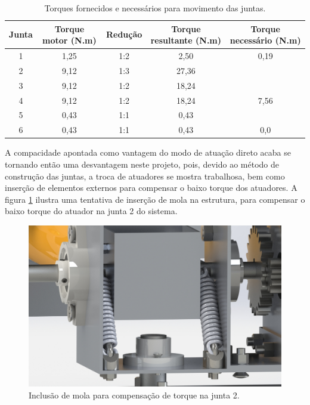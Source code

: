 \begin{table}[htb]
    \begin{centering}    
    
    \caption{Torques fornecidos e necessários para movimento das juntas.}
    
    \begin{tabular}{|c|c|c|c|c|}
        \hline
        Junta & Torque motor (N.m) & Redução & Torque resultante (N.m) & Torque necessário (N.m) \tabularnewline
        \hline
        \hline
        1 & 1,25 & 1:2 &  2,50 &  0,19              \tabularnewline
        \hline
        2 & 9,12 & 1:3 & 27,36 & \color{red}{34,32} \tabularnewline
        \hline
        3 & 9,12 & 1:2 & 18,24 & \color{red}{18,81} \tabularnewline
        \hline
        4 & 9,12 & 1:2 & 18,24 & 7,56               \tabularnewline
        \hline
        5 & 0,43 & 1:1 &  0,43 & \color{red}{4,01}  \tabularnewline
        \hline
        6 & 0,43 & 1:1 &  0,43 & 0,0                \tabularnewline
        \hline
    \end{tabular}
    
    \label{tab:Analise-Torque}
    
\par\end{centering}
\end{table}

A compacidade apontada como vantagem do modo de atuação direto acaba
se tornando então uma desvantagem neste projeto, pois, devido ao método
de construção das juntas, a troca de atuadores se mostra trabalhosa,
bem como inserção de elementos externos para compensar o baixo torque dos atuadores.
A figura \ref{fig:mola} ilustra uma tentativa de inserção de mola na 
estrutura, para compensar o baixo torque do atuador na junta 2 do sistema.

\begin{figure}[h!]
    \caption{Inclusão de mola para compensação de torque na junta 2.}    
    \begin{centering}

        \includegraphics[width=0.7\columnwidth]{images/arm/spring-cropped.jpg}
    
    \par\end{centering}

    \label{fig:mola}
\end{figure}

